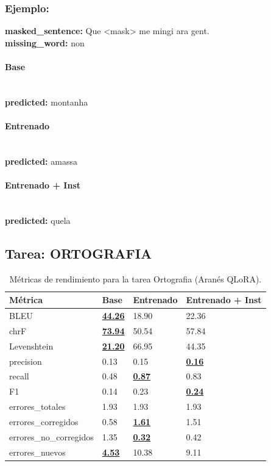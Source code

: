 \subsubsection{Ejemplo:}
\textbf{masked\_sentence:} Que {\textless}mask{\textgreater} me mingi ara gent.\\
\textbf{missing\_word:} non

\paragraph{Base}~\\
\textbf{predicted:} montanha

\paragraph{Entrenado}~\\
\textbf{predicted:} amassa

\paragraph{Entrenado + Inst}~\\
\textbf{predicted:} quela

\subsection{Tarea: ORTOGRAFIA}\label{tarea-ortografia}
\begin{longtable}[]{@{}llll@{}}
\toprule\noalign{}
Métrica & Base & Entrenado & Entrenado + Inst \\
\midrule\noalign{}
\endhead
\bottomrule\noalign{}
\caption{Métricas de rendimiento para la tarea Ortografia (Aranés QLoRA).}
\label{tab:metricas_ortografia_Aranés QLoRA}
\endlastfoot
BLEU & \textbf{\underline{44.26}} & 18.90 & 22.36 \\
chrF & \textbf{\underline{73.94}} & 50.54 & 57.84 \\
Levenshtein & \textbf{\underline{21.20}} & 66.95 & 44.35 \\
precision & 0.13 & 0.15 & \textbf{\underline{0.16}} \\
recall & 0.48 & \textbf{\underline{0.87}} & 0.83 \\
F1 & 0.14 & 0.23 & \textbf{\underline{0.24}} \\
errores\_totales & 1.93 & 1.93 & 1.93 \\
errores\_corregidos & 0.58 & \textbf{\underline{1.61}} & 1.51 \\
errores\_no\_corregidos & 1.35 & \textbf{\underline{0.32}} & 0.42 \\
errores\_nuevos & \textbf{\underline{4.53}} & 10.38 & 9.11 \\
\end{longtable}

